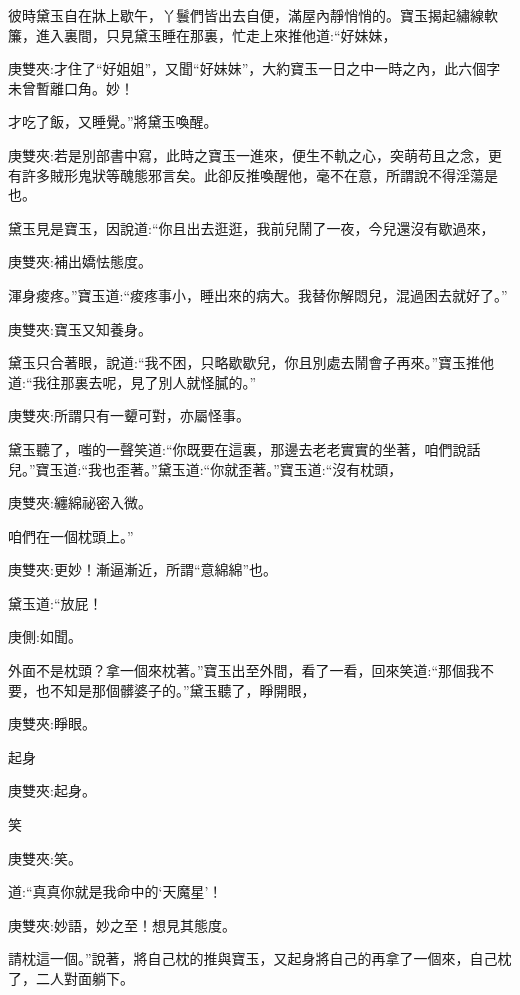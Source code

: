 \begin{parag}
    彼時黛玉自在牀上歇午，丫鬟們皆出去自便，滿屋內靜悄悄的。寶玉揭起繡線軟簾，進入裏間，只見黛玉睡在那裏，忙走上來推他道:“好妹妹，\begin{note}庚雙夾:才住了“好姐姐”，又聞“好妹妹”，大約寶玉一日之中一時之內，此六個字未曾暫離口角。妙！\end{note}才吃了飯，又睡覺。”將黛玉喚醒。\begin{note}庚雙夾:若是別部書中寫，此時之寶玉一進來，便生不軌之心，突萌苟且之念，更有許多賊形鬼狀等醜態邪言矣。此卻反推喚醒他，毫不在意，所謂說不得淫蕩是也。\end{note}黛玉見是寶玉，因說道:“你且出去逛逛，我前兒鬧了一夜，今兒還沒有歇過來，\begin{note}庚雙夾:補出嬌怯態度。\end{note}渾身痠疼。”寶玉道:“痠疼事小，睡出來的病大。我替你解悶兒，混過困去就好了。”\begin{note}庚雙夾:寶玉又知養身。\end{note}黛玉只合著眼，說道:“我不困，只略歇歇兒，你且別處去鬧會子再來。”寶玉推他道:“我往那裏去呢，見了別人就怪膩的。”\begin{note}庚雙夾:所謂只有一顰可對，亦屬怪事。\end{note}
\end{parag}


\begin{parag}
    黛玉聽了，嗤的一聲笑道:“你既要在這裏，那邊去老老實實的坐著，咱們說話兒。”寶玉道:“我也歪著。”黛玉道:“你就歪著。”寶玉道:“沒有枕頭，\begin{note}庚雙夾:纏綿祕密入微。\end{note}咱們在一個枕頭上。”\begin{note}庚雙夾:更妙！漸逼漸近，所謂“意綿綿”也。\end{note}黛玉道:“放屁！\begin{note}庚側:如聞。\end{note}外面不是枕頭？拿一個來枕著。”寶玉出至外間，看了一看，回來笑道:“那個我不要，也不知是那個髒婆子的。”黛玉聽了，睜開眼，\begin{note}庚雙夾:睜眼。\end{note}起身\begin{note}庚雙夾:起身。\end{note}笑\begin{note}庚雙夾:笑。\end{note}道:“真真你就是我命中的‘天魔星’！\begin{note}庚雙夾:妙語，妙之至！想見其態度。\end{note}請枕這一個。”說著，將自己枕的推與寶玉，又起身將自己的再拿了一個來，自己枕了，二人對面躺下。
\end{parag}


